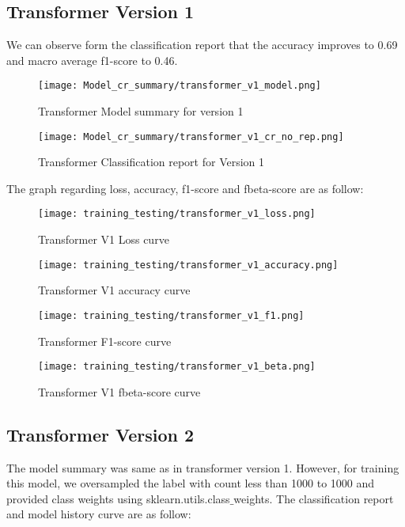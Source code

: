 \subsection{Transformer Version 1}
We can observe form the classification report that the accuracy improves to 0.69 and macro average f1-score to 0.46.

\begin{figure}[H]
    \centering
    \texttt{[image: Model\_cr\_summary/transformer\_v1\_model.png]}
    \caption{Transformer Model summary for version 1}
    \label{fig:Transformer Model summary for version 1}
\end{figure}

\begin{figure}[H]
    \centering
    \texttt{[image: Model\_cr\_summary/transformer\_v1\_cr\_no\_rep.png]}
    \caption{Transformer Classification report for Version 1}
    \label{fig:Transformer Classification report for Version 1}
\end{figure}

The graph regarding loss, accuracy, f1-score and fbeta-score are as follow:

\begin{figure}[H]
    \centering
    \texttt{[image: training\_testing/transformer\_v1\_loss.png]}
    \caption{Transformer V1 Loss curve}
    \label{fig:Transformer V1 loss curve}
\end{figure}

\begin{figure}[H]
    \centering
    \texttt{[image: training\_testing/transformer\_v1\_accuracy.png]}
    \caption{Transformer V1 accuracy curve}
    \label{fig:Transformer V1 accuracy curve}
\end{figure}

\begin{figure}[H]
    \centering
    \texttt{[image: training\_testing/transformer\_v1\_f1.png]}
    \caption{Transformer F1-score curve}
    \label{fig:Transformer F1-score curve}
\end{figure}

\begin{figure}[H]
    \centering
    \texttt{[image: training\_testing/transformer\_v1\_beta.png]}
    \caption{Transformer V1 fbeta-score curve}
    \label{fig:Transformer V1 fbeta-score curve}
\end{figure}

\subsection{Transformer Version 2}
The model summary was same as in transformer version 1. However, for training this model, we oversampled the label with count less than 1000 to 1000 and provided class weights using sklearn.utils.class$\_$weights. The classification report and model history curve are as follow:

